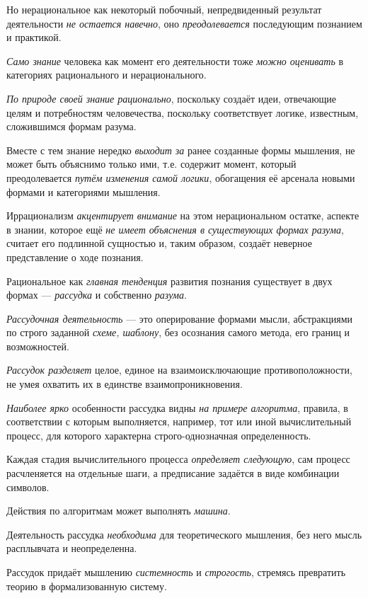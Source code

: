 \documentclass[a4paper,14pt,russian]{extreport}
\begin{document}
Но нерациональное как некоторый побочный, непредвиденный результат деятельности \emph{не остается навечно}, оно \emph{преодолевается} последующим познанием и практикой.

\emph{Само знание} человека как момент его деятельности тоже \emph{можно оценивать} в категориях рационального и нерационального.

\emph{По природе своей знание рационально}, поскольку создаёт идеи, отвечающие целям и потребностям человечества, поскольку соответствует логике, известным, сложившимся формам разума.

Вместе с тем знание нередко \emph{выходит за} ранее созданные формы мышления, не может быть объяснимо только ими, т.е. содержит момент, который преодолевается \emph{путём изменения самой логики}, обогащения её арсенала новыми формами и категориями мышления.

Иррационализм \emph{акцентирует внимание} на этом нерациональном остатке, аспекте в знании, которое ещё \emph{не имеет объяснения в существующих формах разума}, считает его подлинной сущностью и, таким образом, создаёт неверное представление о ходе познания.

Рациональное как \emph{главная тенденция} развития познания существует в двух формах --- \emph{рассудка} и собственно \emph{разума}.

\emph{Рассудочная деятельность} --- это оперирование формами мысли, абстракциями по строго заданной \emph{схеме, шаблону}, без осознания самого метода, его границ и возможностей.

\emph{Рассудок разделяет} целое, единое на взаимоисключающие противоположности, не умея охватить их в единстве взаимопроникновения.

\emph{Наиболее ярко} особенности рассудка видны \emph{на примере алгоритма}, правила, в соответствии с которым выполняется, например, тот или иной вычислительный процесс, для которого характерна строго-однозначная определенность.

Каждая стадия вычислительного процесса \emph{определяет следующую}, сам процесс расчленяется на отдельные шаги, а предписание задаётся в виде комбинации символов.

Действия по алгоритмам может выполнять \emph{машина}.

Деятельность рассудка \emph{необходима} для теоретического мышления, без него мысль расплывчата и неопределенна.

Рассудок придаёт мышлению \emph{системность} и \emph{строгость}, стремясь превратить теорию в формализованную систему.
\end{document}
